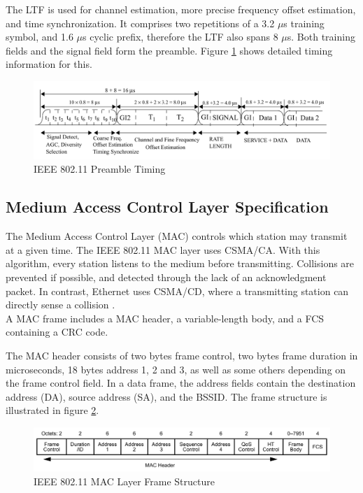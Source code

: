 The \gls{LTF} is used for channel estimation, more precise frequency offset estimation, and time synchronization. It comprises two repetitions of a 3.2 $\mu$s training symbol, and 1.6 $\mu$s cyclic prefix, therefore the \gls{LTF} also spans 8 $\mu$s. Both training fields and the signal field form the preamble. Figure \ref{fig:preamble} shows detailed timing information for this.

\begin{figure}[H]
	\centering
	\includegraphics[width=\textwidth]{gfx/images/preamble-format}
	\caption[IEEE 802.11 Preamble Timing]{IEEE 802.11 Preamble Timing \cite{ieee2012}}
	\label{fig:preamble}
\end{figure}


\subsection{Medium Access Control Layer Specification} \label{sec:mac-format}

The Medium Access Control Layer (MAC) controls which station may transmit at a given time. The \gls{IEEE} 802.11 \gls{MAC} layer uses \gls{CSMA/CA}. With this algorithm, every station listens to the medium before transmitting. Collisions are prevented if possible, and detected through the lack of an acknowledgment packet. In contrast, Ethernet uses \gls{CSMA/CD}, where a transmitting station can directly sense a collision \cite{ieee802-3}.\\

A \gls{MAC} frame includes a \gls{MAC} header, a variable-length body, and a \gls{FCS} containing a \gls{CRC} code.

The \gls{MAC} header consists of two bytes frame control, two bytes frame duration in microseconds, 18 bytes address 1, 2 and 3, as well as some others depending on the frame control field. In a data frame, the address fields contain the destination address (DA), source address (SA), and the \gls{BSSID}. The frame structure is illustrated in figure \ref{fig:mac-format}.

\begin{figure}[H]
	\centering
	\includegraphics[width=\textwidth]{gfx/images/mac-format}
	\caption[IEEE 802.11 MAC Layer Frame Structure]{IEEE 802.11 MAC Layer Frame Structure \cite{ieee2012}}
	\label{fig:mac-format}
\end{figure}


